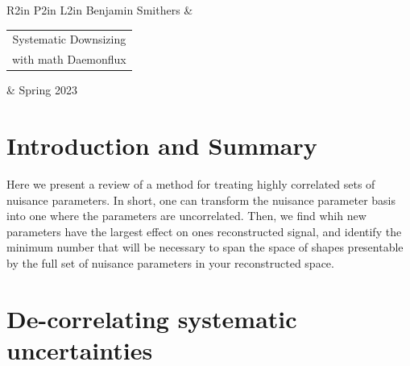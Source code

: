 \documentclass[12pt,a4paper]{article}
\begin{document}
\begin{table}
	\centering
	\begin{tabular}{R{2in} P{2in} L{2in}}
		Benjamin Smithers & \begin{tabular}{c}{\Large Systematic Downsizing} \\ {\small with math Daemonflux }  \end{tabular} & Spring 2023 \\\hline
	\end{tabular}

\end{table}

\section{Introduction and Summary}

Here we present a review of a method for treating highly correlated sets of nuisance parameters. In short, one can transform the nuisance parameter basis into one where the parameters are uncorrelated.
Then, we find whih new parameters have the largest effect on ones reconstructed signal, and identify the minimum number that will be necessary to span the space of shapes presentable by the full set of nuisance parameters in your reconstructed space. 

\section{De-correlating systematic uncertainties}\label{sec:decor}
\end{document}
